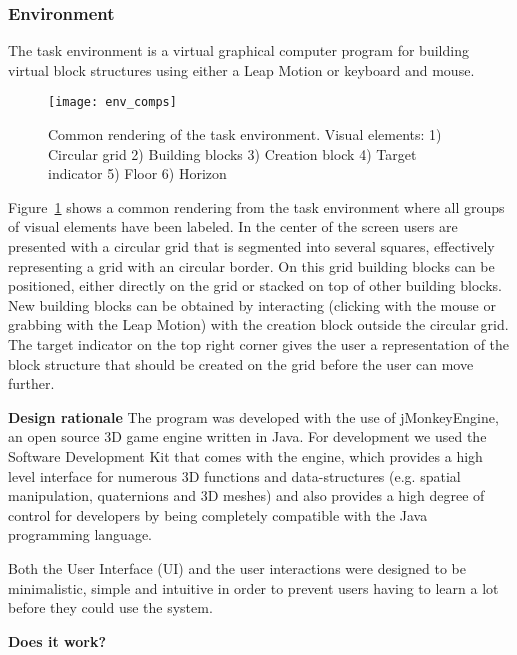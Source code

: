\subsubsection{Environment}

The task environment is a virtual graphical computer program for building virtual block structures using either a Leap Motion or keyboard and mouse. 

\begin{figure}[H]
\centering
\texttt{[image: env\_comps]}
\caption{\label{fig:environmentcomps} Common rendering of the task environment. Visual elements: 1) Circular grid 2) Building blocks 3) Creation block 4) Target indicator 5) Floor 6) Horizon}
\end{figure}

\noindent Figure~\ref{fig:environmentcomps} shows a common rendering from the task environment where all groups of visual elements have been labeled. In the center of the screen users are presented with a circular grid that is segmented into several squares, effectively representing a grid with an circular border. On this grid building blocks can be positioned, either directly on the grid or stacked on top of other building blocks. New building blocks can be obtained by interacting (clicking with the mouse or grabbing with the Leap Motion) with the creation block outside the circular grid. The target indicator on the top right corner gives the user a representation of the block structure that should be created on the grid before the user can move further.


\textbf{Design rationale}
The program was developed with the use of jMonkeyEngine, an open source 3D game engine written in Java. For development we used the Software Development Kit that comes with the engine, which provides a high level interface for numerous 3D functions and data-structures (e.g. spatial manipulation, quaternions and 3D meshes) and also provides a high degree of control for developers by being completely compatible with the Java programming language. 

Both the User Interface (UI) and the user interactions were designed to be minimalistic, simple and intuitive in order to prevent users having to learn a lot before they could use the system. 


\textbf{Does it work?}